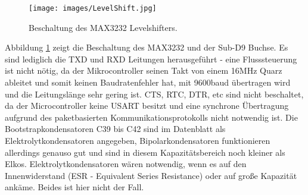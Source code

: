 \documentclass{scrartcl}
\begin{document}
\begin{figure}[h]
\texttt{[image: images/LevelShift.jpg]}
\hspace{-14pt}
\caption{Beschaltung des MAX3232 Levelshifters.}
\label{LevelShift}
\end{figure} 
Abbildung \ref{LevelShift} zeigt die Beschaltung des MAX3232 und der Sub-D9 Buchse. Es sind lediglich die TXD und RXD Leitungen herausgeführt - eine Flusssteuerung ist nicht nötig, da der Mikrocontroller seinen Takt von einem 16MHz Quarz ableitet und somit keinen Baudratenfehler hat, mit 9600baud übertragen wird und die Leitungslänge sehr gering ist. CTS, RTC, DTR, etc sind nicht beschaltet, da der Microcontroller keine USART besitzt und eine synchrone Übertragung aufgrund des paketbasierten Kommunikationsprotokolls nicht notwendig ist. \newline
Die Bootstrapkondensatoren C39 bis C42 sind im Datenblatt als Elektrolytkondensatoren angegeben, Bipolarkondensatoren funktionieren allerdings genauso gut und sind in diesem Kapazitätsbereich noch kleiner als Elkos. Elektrolytkondensatoren wären notwendig, wenn es auf den Innenwiderstand (ESR - Equivalent Series Resistance) oder auf große Kapazität ankäme. Beides ist hier nicht der Fall. 
 
 
\end{document}
